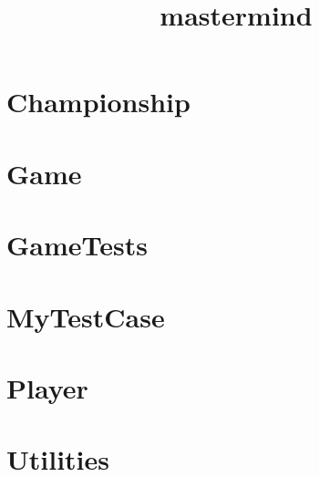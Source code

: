 \documentclass{article}
\begin{document}
\title{mastermind}
\author{}
\maketitle
\tableofcontents

\section{Championship}

\section{Game}

\section{GameTests}

\section{MyTestCase}

\section{Player}

\section{Utilities}

\end{document}
